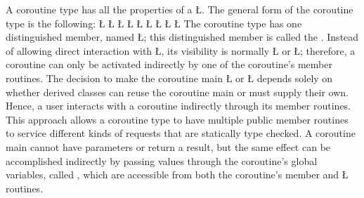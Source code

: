 \documentclass[openright,twoside]{report}
\begin{document}
A coroutine type has all the properties of a \LGinlinetrue\LGbegin\lgrinde\L{}\endlgrinde\LGend{}.
The general form of the coroutine type is the following:
\LGinlinefalse\LGbegin\lgrinde
\L{}
\L{}
\L{\LB{}}
\CE{}\L{}
\L{\LB{}}
\CE{}\L{\LB{}}
\CE{}\L{}
\L{\LB{}}
\CE{}\L{\LB{\};}}
\endlgrinde\LGend
{}%
%
The coroutine type has one distinguished member, named \LGinlinetrue\LGbegin\lgrinde\L{}\endlgrinde\LGend{};
this distinguished member is called the .
Instead of allowing direct interaction with \LGinlinetrue\LGbegin\lgrinde\L{}\endlgrinde\LGend{}, its visibility is normally \LGinlinetrue\LGbegin\lgrinde\L{}\endlgrinde\LGend{} or \LGinlinetrue\LGbegin\lgrinde\L{}\endlgrinde\LGend{};
therefore, a coroutine can only be activated indirectly by one of the coroutine's member routines.
The decision to make the coroutine main \LGinlinetrue\LGbegin\lgrinde\L{}\endlgrinde\LGend{} or \LGinlinetrue\LGbegin\lgrinde\L{}\endlgrinde\LGend{} depends solely on whether derived classes can reuse the coroutine main or must supply their own.
Hence, a user interacts with a coroutine indirectly through its member routines.
This approach allows a coroutine type to have multiple public member routines to service different kinds of requests that are statically type checked.
A coroutine main cannot have parameters or return a result, but the same effect can be accomplished indirectly by passing values through the coroutine's global variables, called , which are accessible from both the coroutine's member and \LGinlinetrue\LGbegin\lgrinde\L{}\endlgrinde\LGend{} routines.
\end{document}
